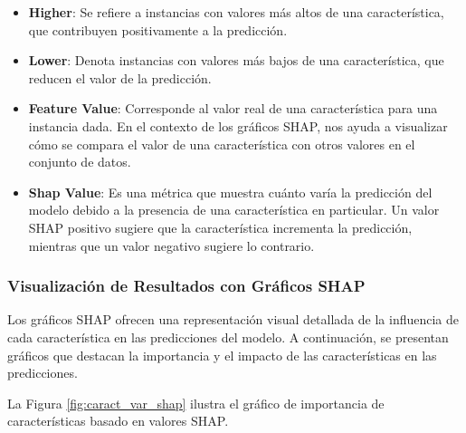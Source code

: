 \begin{itemize}
    \item \textbf{Higher}: Se refiere a instancias con valores más altos de una característica, que contribuyen positivamente a la predicción.
    
    \item \textbf{Lower}: Denota instancias con valores más bajos de una característica, que reducen el valor de la predicción.
    
    \item \textbf{Feature Value}: Corresponde al valor real de una característica para una instancia dada. En el contexto de los gráficos SHAP, nos ayuda a visualizar cómo se compara el valor de una característica con otros valores en el conjunto de datos.
    
    \item \textbf{Shap Value}: Es una métrica que muestra cuánto varía la predicción del modelo debido a la presencia de una característica en particular. Un valor SHAP positivo sugiere que la característica incrementa la predicción, mientras que un valor negativo sugiere lo contrario.
\end{itemize}

\subsubsection{Visualización de Resultados con Gráficos SHAP}

Los gráficos SHAP ofrecen una representación visual detallada de la influencia de cada característica en las predicciones del modelo. A continuación, se presentan gráficos que destacan la importancia y el impacto de las características en las predicciones.

La Figura \ref{fig:caract_var_shap} ilustra el gráfico de importancia de características basado en valores SHAP.

